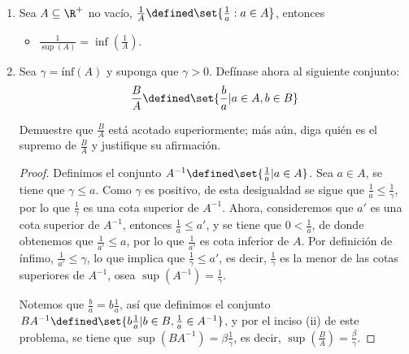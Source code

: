 \begin{enumerate}[label=\alph*)]
  (*) Por Cálculo 1; se tiene que $a \leq \alpha \Rightarrow ab \leq \alpha b$, pues $b>0$ y $b \leq \beta \Rightarrow \alpha b \leq \alpha \beta$, pues $\alpha>0$. Por transitividad, $ab\leq \alpha \beta$.
  
  (**) Si $\epsilon_2 = \frac{\epsilon_1}{\alpha+\beta+1}$ se tiene que
  \begin{align*}
    (\alpha+\beta)\epsilon_2 = \frac{(\alpha+\beta)\epsilon_1}{\alpha+\beta+1} < \epsilon_1
  \end{align*}
  Por lo que $-(\alpha+\beta)\epsilon_2 > - \epsilon_1$.
  
  \item Sea $A\subseteq \R^+$ no vacío, $\frac{1}{A} \defined \set{\frac{1}{a}: a\in A}$, entonces
  \begin{itemize}
    \item $\frac{1}{\sup(A)} = \inf(\frac{1}{A})$.
  \end{itemize}
  
  \item Sea $\gamma=\text{ínf}(A)$ y suponga que $\gamma>0$. Defínase ahora al siguiente conjunto: \[\frac{B}{A} \defined \set{\frac{b}{a}| a\in A, b\in B}\]
  
  Demuestre que $\frac{B}{A}$ está acotado superiormente; más aún, diga quién es el supremo de $\frac{B}{A}$ y justifique su afirmación.
  
  \begin{proof}\leavevmode
    Definimos el conjunto $A^{-1} \defined \set{\frac{1}{a}| a\in A}$. Sea $a\in A$, se tiene que $\gamma \leq a$. Como $\gamma$ es positivo, de esta desigualdad se sigue que $\frac{1}{a} \leq \frac{1}{\gamma}$, por lo que $\frac{1}{\gamma}$ es una cota superior de $A^{-1}$. Ahora, consideremos que $a'$ es una cota superior de $A^{-1}$, entonces $\frac{1}{a} \leq a'$, y se tiene que $0<\frac{1}{a}$, de donde obtenemos que $\frac{1}{a'} \leq a$, por lo que $\frac{1}{a'}$ es cota inferior de $A$. Por definición de ínfimo, $\frac{1}{a'}\leq \gamma$, lo que implica que $\frac{1}{\gamma} \leq a'$, es decir, $\frac{1}{\gamma}$ es la menor de las cotas superiores de $A^{-1}$, osea $\sup(A^{-1})=\frac{1}{\gamma}$.
    
    Notemos que $\frac{b}{a} = b\frac{1}{a}$, así que definimos el conjunto $BA^{-1}\defined \set{b\frac{1}{a}|b\in B, \frac{1}{a}\in A^{-1}}$, y por el inciso (ii) de este problema, se tiene que $\sup(BA^{-1})=\beta \frac{1}{\gamma}$, es decir, $\sup(\frac{B}{A})=\frac{\beta}{\gamma}$.
  \end{proof}
  

\end{enumerate}
